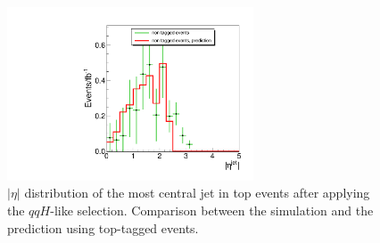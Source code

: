 \begin{figure}[!htbp]
\begin{center}
\includegraphics[width=0.65\textwidth]{figures/vbf_btagprediction_jetmin.pdf}
\caption{$|\eta|$ distribution of the most central jet in top events after 
applying the $qqH$-like selection. Comparison between the simulation and 
the prediction using top-tagged events.}
\label{fig:vbf_btagprediction_jetmin}
\end{center}
\end{figure}
